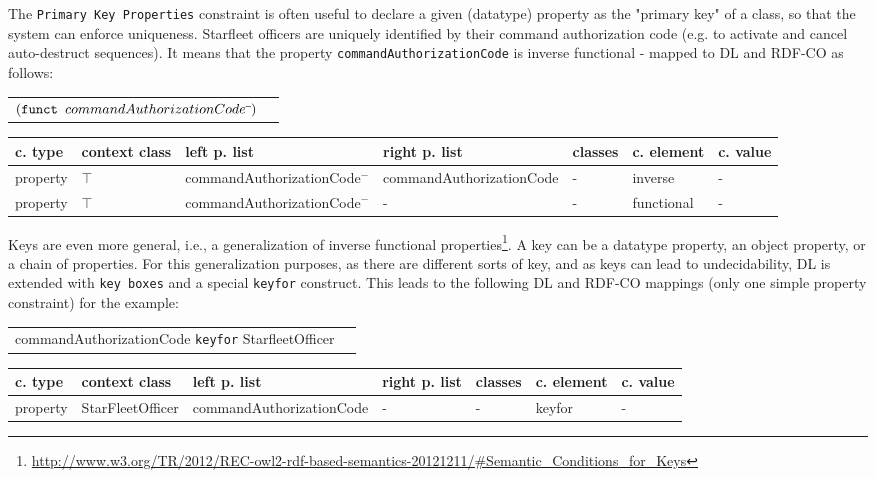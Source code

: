 \documentclass{llncs}
\newcommand{\ms}[1]{\texttt{#1}}
\newenvironment{gcotable}{
  \scriptsize
  \sffamily
  \vspace{0.3cm}
	\begin{center}
  \begin{tabular}{l|l|l|l|l|l|l}
  \hline
  \textbf{c. type} & \textbf{context class} & \textbf{left p. list} & \textbf{right p. list} & \textbf{classes} & \textbf{c. element} & \textbf{c. value} \\
  \hline

}{
  \hline
  \end{tabular}
	\end{center}
}
\newenvironment{DL}{
  \vspace{0.3cm}
	\begin{center}
  \begin{tabular}{r l}

}{
  \end{tabular}
	\end{center}
}
\begin{document}
The \ms{Primary Key Properties} constraint is often useful to declare a given (datatype) property as the "primary key" of a class, so that the system can enforce uniqueness. 
Starfleet officers are uniquely identified by their command authorization code (e.g. to activate and cancel auto-destruct sequences).
It means that the property \ms{commandAuthorizationCode} is inverse functional - mapped to DL and RDF-CO as follows:

\begin{DL}
$(\ms{funct } commandAuthorizationCode\sp{\overline{\ }})$
\end{DL}

\begin{gcotable}
property & $\top$ & commandAuthorizationCode$^{-}$ & commandAuthorizationCode & - & inverse & - \\
property & $\top$ & commandAuthorizationCode$^{-}$ & - & - & functional & - \\
\end{gcotable}

Keys are even more general, i.e., a generalization of inverse functional properties\footnote{\url{http://www.w3.org/TR/2012/REC-owl2-rdf-based-semantics-20121211/#Semantic_Conditions_for_Keys}}.
A key can be a datatype property, an object property, or a chain of properties.
For this generalization purposes, as there are different sorts of key, and as keys can lead to undecidability, 
DL is extended with \ms{key boxes} and a special \ms{keyfor} construct\cite{Lutz2005}.
This leads to the following DL and RDF-CO mappings (only one simple property constraint) for the example:

\begin{DL}
commandAuthorizationCode \ms{keyfor} StarfleetOfficer
\end{DL}

\begin{gcotable}
property & StarFleetOfficer & commandAuthorizationCode & - & - & keyfor & - \\
\end{gcotable}

\end{document}
